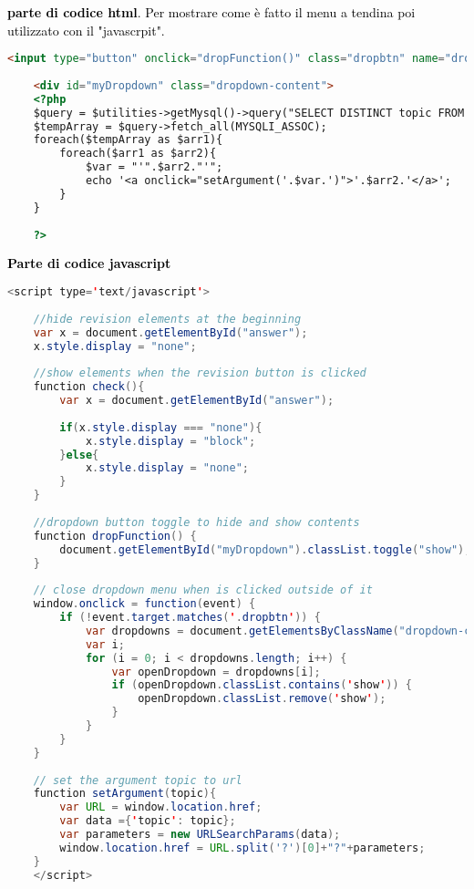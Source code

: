 \textcolor{black}{\textbf{parte di codice html}. Per mostrare come è fatto il menu a tendina poi utilizzato con il "javascrpit".}\\

\begin{lstlisting}[language=html]
	 <input type="button" onclick="dropFunction()" class="dropbtn" name="dropdown" value="Seleziona capitolo">
	
	<div id="myDropdown" class="dropdown-content">
	<?php
	$query = $utilities->getMysql()->query("SELECT DISTINCT topic FROM charting_test_5d");
	$tempArray = $query->fetch_all(MYSQLI_ASSOC);
	foreach($tempArray as $arr1){
		foreach($arr1 as $arr2){
			$var = "'".$arr2."'";
			echo '<a onclick="setArgument('.$var.')">'.$arr2.'</a>';
		}
	}		
	
	?>			
\end{lstlisting}

\textcolor{black}{\textbf{Parte di codice javascript}}\\

\begin{lstlisting}[language=java]
	<script type='text/javascript'>
	
	//hide revision elements at the beginning
	var x = document.getElementById("answer");
	x.style.display = "none";
	
	//show elements when the revision button is clicked
	function check(){
		var x = document.getElementById("answer");
		
		if(x.style.display === "none"){
			x.style.display = "block";
		}else{
			x.style.display = "none";
		}	
	}
	
	//dropdown button toggle to hide and show contents
	function dropFunction() {
		document.getElementById("myDropdown").classList.toggle("show");
	}
	
	// close dropdown menu when is clicked outside of it
	window.onclick = function(event) {
		if (!event.target.matches('.dropbtn')) {
			var dropdowns = document.getElementsByClassName("dropdown-content");
			var i;
			for (i = 0; i < dropdowns.length; i++) {
				var openDropdown = dropdowns[i];
				if (openDropdown.classList.contains('show')) {
					openDropdown.classList.remove('show');
				}
			}
		}
	}
	
	// set the argument topic to url
	function setArgument(topic){
		var URL = window.location.href;
		var data ={'topic': topic};
		var parameters = new URLSearchParams(data);
		window.location.href = URL.split('?')[0]+"?"+parameters;
	}
	</script>
\end{lstlisting}

